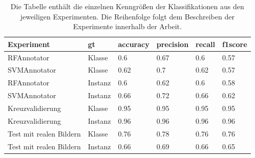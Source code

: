 \begin{table}
\begin{tabularx}{\textwidth}{Xlllll}
\textbf{Experiment}	&	\textbf{\gls{gt}}	& \textbf{\gls{accuracy}} & \textbf{\gls{precision}}	& \textbf{\gls{recall}}	& \textbf{\gls{f1score}} \\ \hline
RFAnnotator				&Klasse		&0.6	&0.67	&0.6	&0.57	\\
SVMAnnotator			&Klasse		&0.62	&0.7	&0.62	&0.57	\\
RFAnnotator				&Instanz	&0.6	&0.62	&0.6	&0.58	\\
SVMAnnotator			&Instanz	&0.66	&0.72	&0.66	&0.62	\\ \hline
Kreuzvalidierung		&Klasse		&0.95	&0.95	&0.95	&0.95	\\
Kreuzvalidierung		&Instanz	&0.96	&0.96	&0.96	&0.96	\\ \hline
Test mit realen Bildern	&Klasse		&0.76	&0.78	&0.76	&0.76	\\
Test mit realen Bildern	&Instanz	&0.66	&0.69	&0.66	&0.65	\\
\end{tabularx}
\caption[Übersicht der Kenngrößen der einzelnen Experimente]{Die Tabelle enthält die einzelnen Kenngrößen der Klassifikationen aus den jeweiligen Experimenten. Die Reihenfolge folgt dem Beschreiben der Experimente innerhalb der Arbeit.}
\label{tab:classification_all}
\end{table}